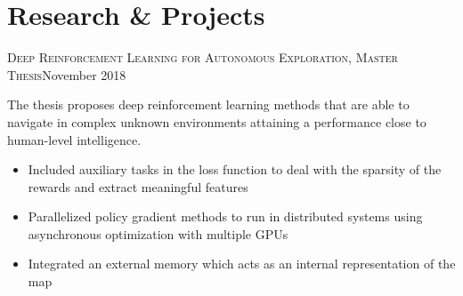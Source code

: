 \documentclass[11pt,a4paper,sans]{moderncv}
\begin{document}
\section{\LARGE{Research \& Projects}}
\vspace{2mm}
\cventry{}
{\vspace{-0.4cm}}
{\textsc{Deep Reinforcement Learning for Autonomous Exploration, Master Thesis}}{November 2018}{}
{
	The thesis proposes deep reinforcement learning methods that are able to navigate in complex unknown environments attaining a performance close to human-level intelligence. 		
	\vspace{1mm}
	\begin{itemize}
		\item Included auxiliary tasks in the loss function to deal with the sparsity of the rewards and extract meaningful features
		\item Parallelized policy gradient methods to run in distributed systems using asynchronous optimization with multiple GPUs 
		\item Integrated an external memory which acts as an internal representation of the map
		\vspace{2mm}			
	\end{itemize}
}
\end{document}
